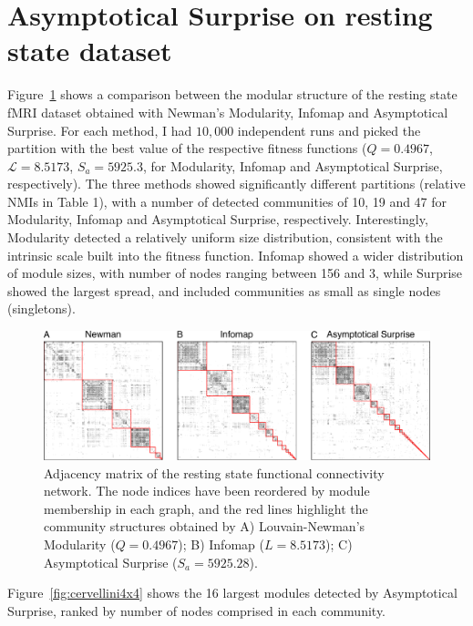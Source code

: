 \section{Asymptotical Surprise on resting state dataset}
Figure~\ref{fig:partitioncomparison} shows a comparison between the modular structure of the resting state fMRI dataset obtained with Newman's Modularity, Infomap and Asymptotical Surprise.
For each method, I had $10,000$ independent runs and picked the partition with the best value of the respective fitness functions ($Q=0.4967$, $\mathcal{L}=8.5173$, $S_a=5925.3$, for Modularity, Infomap and Asymptotical Surprise, respectively).
The three methods showed significantly different partitions (relative NMIs in Table 1), with a number of detected communities of 10, 19 and 47 for Modularity, Infomap and Asymptotical Surprise, respectively.
Interestingly, Modularity detected a relatively uniform size distribution, consistent with the intrinsic scale built into the fitness function.
Infomap showed a wider distribution of module sizes, with number of nodes ranging between 156 and 3, while Surprise showed the largest spread, and included communities as small as single nodes (singletons).
\begin{figure}[!htb]
\centering
\includegraphics[width=\textwidth]{images/pacopaperfigure6.pdf}
\caption{Adjacency matrix of the resting state functional connectivity network.
The node indices have been reordered by module membership in each graph, and the red lines highlight the community structures obtained by A) Louvain-Newman's Modularity ($Q=0.4967$); B) Infomap ($L=8.5173$); C) Asymptotical Surprise ($S_a=5925.28$).}
\label{fig:partitioncomparison}
\end{figure}

Figure~\ref{fig:cervellini4x4} shows the 16 largest modules detected by Asymptotical Surprise, ranked by number of nodes comprised in each community.

